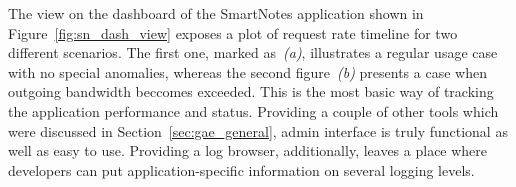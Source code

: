 The view on the dashboard of the SmartNotes application shown in Figure~\ref{fig:sn_dash_view} exposes a plot of request rate timeline for two different scenarios. The first one, marked as~\textit{(a)}, illustrates a regular usage case with no special anomalies, whereas the second figure~\textit{(b)} presents a case when outgoing bandwidth beccomes exceeded. This is the most basic way of tracking the application performance and status. Providing a couple of other tools which were discussed in Section~\ref{sec:gae_general}, admin interface is truly functional as well as easy to use. Providing a log browser, additionally, leaves a place where developers can put application-specific information on several logging levels.    
\begin{figure}[ht]
  \begin{center}

\end{center}
\end{figure}
